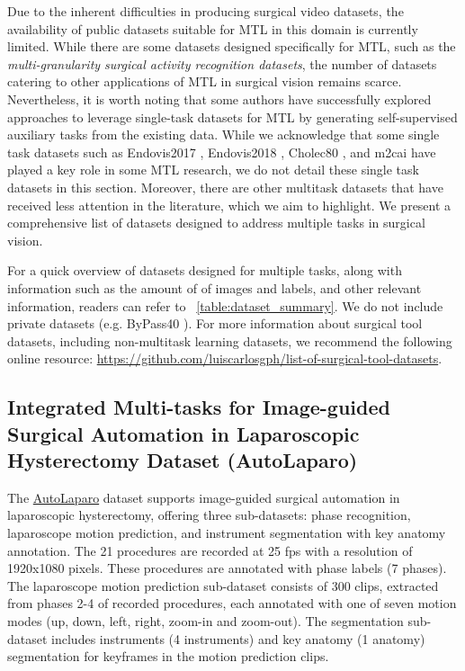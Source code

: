 \documentclass[times,twocolumn,final]{elsarticle}
\newcommand{\tabref}[1]{\tablename~\ref{#1}}
\begin{document}
Due to the inherent difficulties in producing surgical video datasets, the availability of public datasets suitable for MTL in this domain is currently limited. While there are some datasets designed specifically for MTL, such as the \textit{multi-granularity surgical activity recognition datasets}, the number of datasets catering to other applications of MTL in surgical vision remains scarce. 
Nevertheless, it is worth noting that some authors have successfully explored approaches to leverage single-task datasets for MTL by generating self-supervised auxiliary tasks from the existing data.
While we acknowledge that some single task datasets such as Endovis2017 \citep{endovis2017}, Endovis2018 \citep{endovis2018}, Cholec80 \citep{EndoNet}, and m2cai \citep{jin2018tool} have played a key role in some MTL research,
we do not detail these single task datasets in this section.  Moreover, there are other multitask datasets that have received less attention in the literature, which we aim to highlight. We present a comprehensive list of datasets designed to address multiple tasks in surgical vision. 


For a quick overview of datasets designed for multiple tasks, along with information such as the amount of of images and labels, and other relevant information, readers can refer to \tabref{table:dataset_summary}.
We do not include private datasets (e.g. ByPass40 \citep{Ramesh2021_phase_step_gastric_bypass}). For more information about surgical tool datasets, including non-multitask learning datasets, we recommend the following online resource: \href{ https://github.com/luiscarlosgph/list-of-surgical-tool-datasets}{https://github.com/luiscarlosgph/list-of-surgical-tool-datasets}.   

\subsection{Integrated Multi-tasks for 
Image-guided Surgical Automation in Laparoscopic Hysterectomy Dataset (AutoLaparo)}
The \href{https://autolaparo.github.io/}{AutoLaparo} dataset \citep{autolaparo} supports image-guided surgical automation in laparoscopic hysterectomy, offering three sub-datasets: phase recognition, laparoscope motion prediction, and instrument segmentation with key anatomy annotation. The 21 procedures are recorded at 25 fps with a resolution of 1920x1080 pixels. These procedures are annotated with phase labels (7 phases). The laparoscope motion prediction sub-dataset consists of 300 clips, extracted from phases 2-4 of recorded procedures, each annotated with one of seven motion modes (up, down, left, right, zoom-in and zoom-out). The segmentation sub-dataset includes instruments (4 instruments) and key anatomy (1 anatomy) segmentation for keyframes in the motion prediction clips.
\end{document}
